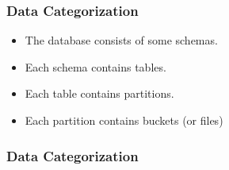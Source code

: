 \begin{frame}
	\frametitle{Data Categorization}
	\begin{itemize}[<+->]
		\item The database consists of some schemas.
		\item Each schema contains tables.
		\item Each table contains partitions.
		\item Each partition contains buckets (or files)
	\end{itemize}
	
\end{frame}
\begin{frame}
	\frametitle{Data Categorization}
	
\end{frame}
